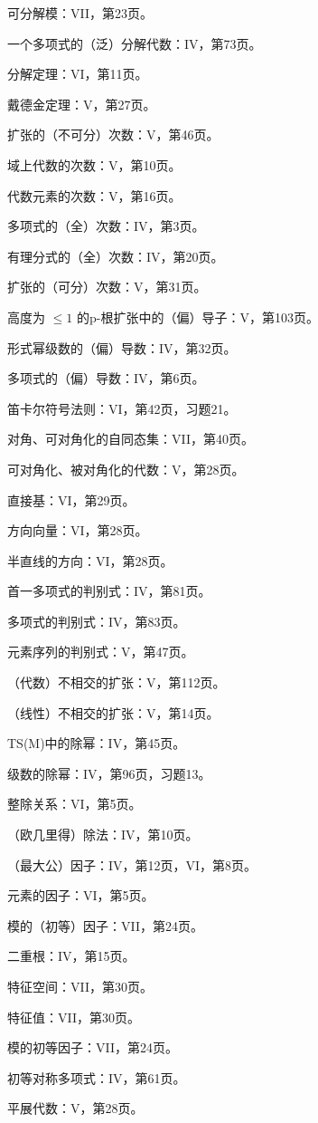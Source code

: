 可分解模：VII，第23页。

一个多项式的（泛）分解代数：IV，第73页。

分解定理：VI，第11页。

戴德金定理：V，第27页。

扩张的（不可分）次数：V，第46页。

域上代数的次数：V，第10页。

代数元素的次数：V，第16页。

多项式的（全）次数：IV，第3页。

有理分式的（全）次数：IV，第20页。

扩张的（可分）次数：V，第31页。

高度为 \(\leqslant 1\) 的p-根扩张中的（偏）导子：V，第103页。

形式幂级数的（偏）导数：IV，第32页。

多项式的（偏）导数：IV，第6页。

笛卡尔符号法则：VI，第42页，习题21。

对角、可对角化的自同态集：VII，第40页。

可对角化、被对角化的代数：V，第28页。

直接基：VI，第29页。

方向向量：VI，第28页。

半直线的方向：VI，第28页。

首一多项式的判别式：IV，第81页。

多项式的判别式：IV，第83页。

元素序列的判别式：V，第47页。

（代数）不相交的扩张：V，第112页。

（线性）不相交的扩张：V，第14页。

TS(M)中的除幂：IV，第45页。

级数的除幂：IV，第96页，习题13。

整除关系：VI，第5页。

（欧几里得）除法：IV，第10页。

（最大公）因子：IV，第12页，VI，第8页。

元素的因子：VI，第5页。

模的（初等）因子：VII，第24页。

二重根：IV，第15页。

特征空间：VII，第30页。

特征值：VII，第30页。

模的初等因子：VII，第24页。

初等对称多项式：IV，第61页。

平展代数：V，第28页。

